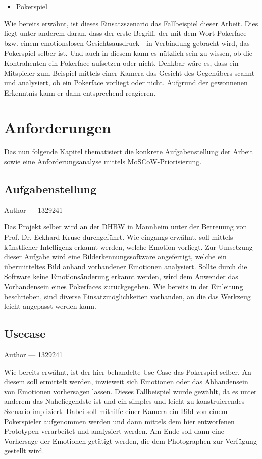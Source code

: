 \documentclass[12pt, a4paper]{report}
\makeatletter
\newcommand{\sectionauthor}[1]{%
  {\parindent0pt\vspace*{-5pt}%
  \large{Author --- }
  \linespread{1.1}\large\scshape#1%
  \par\nobreak\vspace*{35pt} }
  \@afterheading%
}
\makeatother
\begin{document}
\begin{itemize}
	\item{Pokerspiel}
\end{itemize}
Wie bereits erwähnt, ist dieses Einsatzszenario das Fallbeispiel dieser Arbeit. Dies liegt unter anderem daran, dass der erste Begriff, der mit dem Wort Pokerface - bzw. einem emotionslosen Gesichtsausdruck - in Verbindung gebracht wird, das Pokerspiel selber ist. Und auch in diesem kann es nützlich sein zu wissen, ob die Kontrahenten ein Pokerface aufsetzen oder nicht. Denkbar wäre es, dass ein Mitspieler zum Beispiel mittels einer Kamera das Gesicht des Gegenübers scannt und analysiert, ob ein Pokerface vorliegt oder nicht. Aufgrund der gewonnenen Erkenntnis kann er dann entsprechend reagieren.

\chapter{Anforderungen}
Das nun folgende Kapitel thematisiert die konkrete Aufgabenstellung der Arbeit sowie eine Anforderungsanalyse mittels MoSCoW-Priorisierung. 

\section{Aufgabenstellung}
\sectionauthor{1329241}
Das Projekt selber wird an der DHBW in Mannheim unter der Betreuung von Prof. Dr. Eckhard Kruse durchgeführt. Wie eingangs erwähnt, soll mittels künstlicher Intelligenz erkannt werden, welche Emotion vorliegt. Zur Umsetzung dieser Aufgabe wird eine Bilderkennungssoftware angefertigt, welche ein übermitteltes Bild anhand vorhandener Emotionen analysiert. Sollte durch die Software keine Emotionsänderung erkannt werden, wird dem Anwender das Vorhandensein eines Pokerfaces zurückgegeben. Wie bereits in der Einleitung beschrieben, sind diverse Einsatzmöglichkeiten vorhanden, an die das Werkzeug leicht angepasst werden kann.

\section{Usecase}
\sectionauthor{1329241}
Wie bereits erwähnt, ist der hier behandelte Use Case das Pokerspiel selber. An diesem soll ermittelt werden, inwieweit sich Emotionen oder das Abhandensein von Emotionen vorhersagen lassen. Dieses Fallbeispiel wurde gewählt, da es unter anderem das Naheliegendste ist und ein simples und leicht zu konstruierendes Szenario impliziert. Dabei soll mithilfe einer Kamera ein Bild von einem Pokerspieler aufgenommen werden und dann mittels dem hier entworfenen Prototypen verarbeitet und analysiert werden. Am Ende soll dann eine Vorhersage der Emotionen getätigt werden, die dem Photographen zur Verfügung gestellt wird.
\end{document}
